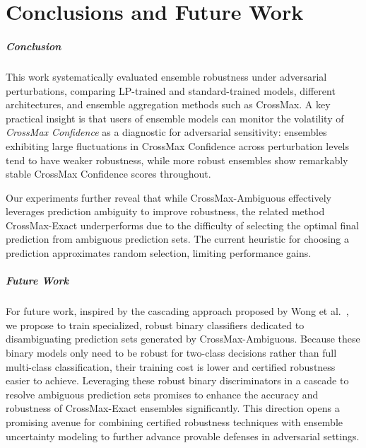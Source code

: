 \chapter{Conclusions and Future Work}
\label{chap:conclusion & future work}

\paragraph{Conclusion}
This work systematically evaluated ensemble robustness under adversarial perturbations, comparing LP-trained and standard-trained models, different architectures, and ensemble aggregation methods such as CrossMax. A key practical insight is that users of ensemble models can monitor the volatility of \textit{CrossMax Confidence} as a diagnostic for adversarial sensitivity: ensembles exhibiting large fluctuations in CrossMax Confidence across perturbation levels tend to have weaker robustness, while more robust ensembles show remarkably stable CrossMax Confidence scores throughout.

Our experiments further reveal that while CrossMax-Ambiguous effectively leverages prediction ambiguity to improve robustness, the related method CrossMax-Exact underperforms due to the difficulty of selecting the optimal final prediction from ambiguous prediction sets. The current heuristic for choosing a prediction approximates random selection, limiting performance gains.

\paragraph{Future Work}
For future work, inspired by the cascading approach proposed by Wong et al.~\cite{wong2018scaling}, we propose to train specialized, robust binary classifiers dedicated to disambiguating prediction sets generated by CrossMax-Ambiguous. Because these binary models only need to be robust for two-class decisions rather than full multi-class classification, their training cost is lower and certified robustness easier to achieve. Leveraging these robust binary discriminators in a cascade to resolve ambiguous prediction sets promises to enhance the accuracy and robustness of CrossMax-Exact ensembles significantly. This direction opens a promising avenue for combining certified robustness techniques with ensemble uncertainty modeling to further advance provable defenses in adversarial settings.